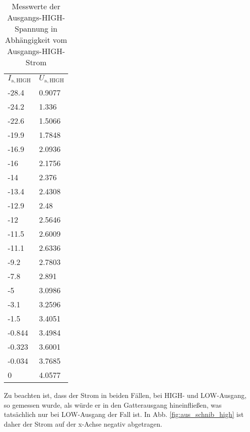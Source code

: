 \begin{table}[h]
\begin{minipage}[t]{0.48\linewidth}
    \begin{tabular}{ll}
      \rowcolor{gray0} 
      $I_\mathrm{a, HIGH}$ & $U_\mathrm{a, HIGH}$ \\
      -28.4                & 0.9077               \\
      -24.2                & 1.336                \\
      -22.6                & 1.5066               \\
      -19.9                & 1.7848               \\
      -16.9                & 2.0936               \\
      -16                  & 2.1756               \\
      -14                  & 2.376                \\
      -13.4                & 2.4308               \\
      -12.9                & 2.48                 \\
      -12                  & 2.5646               \\
      -11.5                & 2.6009               \\
      -11.1                & 2.6336               \\
      -9.2                 & 2.7803               \\
      -7.8                 & 2.891                \\
      -5                   & 3.0986               \\
      -3.1                 & 3.2596               \\
      -1.5                 & 3.4051               \\
      -0.844               & 3.4984               \\
      -0.323               & 3.6001               \\
      -0.034               & 3.7685               \\
      0                    & 4.0577              
    \end{tabular} 

  \caption{Messwerte der Ausgangs-HIGH-Spannung in Abhängigkeit vom Ausgangs-HIGH-Strom}
\end{minipage}
\vspace{\parskip}
\end{table}


Zu beachten ist, dass der Strom in beiden Fällen, bei HIGH- und LOW-Ausgang, so
gemessen wurde, als würde er in den Gatterausgang hineinfließen, was tatsächlich
nur bei LOW-Ausgang der Fall ist. In Abb. \ref{fig:aus_schnib_high} ist daher
der Strom auf der x-Achse negativ abgetragen.